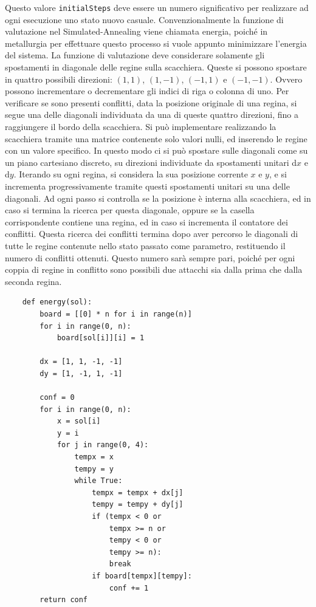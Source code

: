 \documentclass{article}
\numberwithin{equation}{subsection}
\begin{document}
Questo valore \verb|initialSteps| deve essere un numero significativo per realizzare ad ogni esecuzione uno stato nuovo casuale. 
Convenzionalmente la funzione di valutazione nel Simulated-Annealing viene chiamata energia, poiché in metallurgia per effettuare questo processo si vuole appunto minimizzare l'energia del sistema. 
La funzione di valutazione deve considerare solamente gli spostamenti in diagonale delle regine sulla scacchiera. Queste si possono spostare in quattro possibili direzioni: $(1,1)$, $(1,-1)$, $(-1, 1)$ e $(-1,-1)$. 
Ovvero possono incrementare o decrementare gli indici di riga o colonna di uno. Per verificare se sono presenti conflitti, data la posizione originale di una regina, si segue una delle diagonali individuata da 
una di queste quattro direzioni, fino a raggiungere il bordo della scacchiera. Si può implementare realizzando la scacchiera tramite una matrice contenente solo valori nulli, ed inserendo le regine 
con un valore specifico. In questo modo ci si può spostare sulle diagonali come su un piano cartesiano discreto, su direzioni individuate da spostamenti unitari d$x$ e d$y$. Iterando su ogni regina, si 
considera la sua posizione corrente $x$ e $y$, e si incrementa progressivamente tramite questi spostamenti unitari su una delle diagonali. Ad ogni passo si controlla se la posizione è interna alla scacchiera, 
ed in caso si termina la ricerca per questa diagonale, oppure se la casella corrispondente contiene una regina, ed in caso si incrementa il contatore dei conflitti. Questa ricerca dei conflitti termina dopo 
aver percorso le diagonali di tutte le regine contenute nello stato passato come parametro, restituendo il numero di conflitti ottenuti. Questo numero sarà sempre pari, poiché per ogni coppia di regine in conflitto 
sono possibili due attacchi sia dalla prima che dalla seconda regina. 
\begin{verbatim}
    def energy(sol):
        board = [[0] * n for i in range(n)]
        for i in range(0, n):
            board[sol[i]][i] = 1
        
        dx = [1, 1, -1, -1]
        dy = [1, -1, 1, -1]

        conf = 0
        for i in range(0, n):
            x = sol[i]
            y = i
            for j in range(0, 4):
                tempx = x
                tempy = y
                while True:
                    tempx = tempx + dx[j]
                    tempy = tempy + dy[j]
                    if (tempx < 0 or
                        tempx >= n or
                        tempy < 0 or
                        tempy >= n):
                        break
                    if board[tempx][tempy]:
                        conf += 1
        return conf
\end{verbatim}
\end{document}

